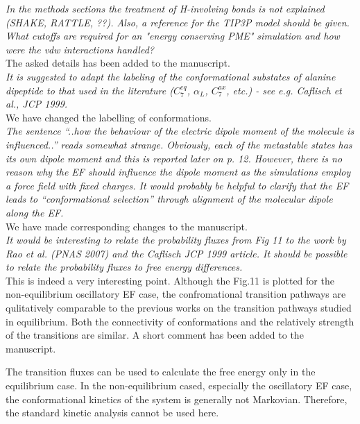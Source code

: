 \documentclass[]{revtex4-1}
\begin{document}
\emph{ In the methods sections the treatment of H-involving bonds is
  not explained (SHAKE, RATTLE, ??). Also, a reference for the TIP3P
  model should be given. What cutoffs are required for an "energy
  conserving PME" simulation and how were the vdw interactions
  handled?  }\\

The asked details has been added to the manuscript.\\

\emph{
It is suggested to adapt the labeling of the conformational substates
of alanine dipeptide to that used in the literature ($C_7^{eq}$, $\alpha_L$,
$C_7^{ax}$, etc.) - see e.g. Caflisch et al., JCP 1999.
}\\

We have changed the labelling of conformations.\\

\emph{
The sentence ``..how the behaviour of the electric dipole moment of the
molecule is influenced..'' reads somewhat strange. Obviously, each of
the metastable states has its own dipole moment and this is reported
later on p. 12. However, there is no reason why the EF should
\emph{influence} the dipole moment as the simulations employ a force field
with fixed charges. It would probably be helpful to clarify that the
EF leads to ``conformational selection'' through alignment of the
molecular dipole along the EF.
}\\

We have made corresponding changes to the manuscript.\\

\emph{ It would be interesting to relate the probability fluxes from
  Fig 11 to the work by Rao et al. (PNAS 2007) and the Caflisch JCP
  1999 article. It should be possible to relate the probability fluxes
  to free energy differences.}\\

This is indeed a very interesting point. Although the Fig.11 is
plotted for the non-equilibrium oscillatory EF case, the
confromational transition pathways are qulitatively comparable to the
previous works on the transition pathways studied in equilibrium.
Both the connectivity of conformations and the relatively strength of
the transitions are similar. A short comment has been added to the
manuscript.

The transition fluxes can be used to calculate the free energy only in
the equilibrium case. In the non-equilibrium cased, especially the
oscillatory EF case, the conformational kinetics of the system is generally
not Markovian. Therefore, the standard kinetic analysis cannot be used
here.
\end{document}
